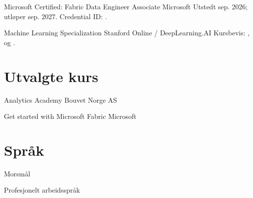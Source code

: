 \documentclass[a4paper,
		10pt]{article}
\let\oldhref\href
\renewcommand{\href}[3][blue]{\oldhref{#2}{\color{#1}{#3}}}
\begin{document}
	{Microsoft Certified: Fabric Data Engineer Associate}
	{Microsoft}
	{Utstedt sep. 2026; utløper sep. 2027. Credential ID: \href{https://learn.microsoft.com/en-us/users/ghalv/credentials/6ec35a11a0c0a54d}{6EC35A11A0C0A54D}.}

	{Machine Learning Specialization}
	{Stanford Online / DeepLearning.AI}
	{Kursbevis: \href{https://www.coursera.org/account/accomplishments/certificate/YXVDZ42BTVC7}{Supervised Machine Learning: Regression and Classification}, \href{https://www.coursera.org/account/accomplishments/certificate/CYZMDL27UEGN}{Advanced Learning Algorithms} og \href{https://www.coursera.org/account/accomplishments/certificate/RJTW6ZD7FUWG}{Unsupervised Learning, Recommenders, Reinforcement Learning}.}

\section{Utvalgte kurs}

	{Analytics Academy}
	{Bouvet Norge AS}
	{}

	{Get started with Microsoft Fabric}
	{Microsoft}
	{}

\section{Språk}

	{Morsmål}
	{}
	{}

	{Profesjonelt arbeidsspråk}
	{}
	{}
\end{document}
